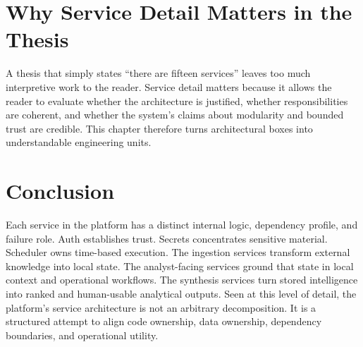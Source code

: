 \section{Why Service Detail Matters in the Thesis}
A thesis that simply states ``there are fifteen services'' leaves too much interpretive work to the reader. Service detail matters because it allows the reader to evaluate whether the architecture is justified, whether responsibilities are coherent, and whether the system's claims about modularity and bounded trust are credible. This chapter therefore turns architectural boxes into understandable engineering units.

\section*{Conclusion}
Each service in the platform has a distinct internal logic, dependency profile, and failure role. Auth establishes trust. Secrets concentrates sensitive material. Scheduler owns time-based execution. The ingestion services transform external knowledge into local state. The analyst-facing services ground that state in local context and operational workflows. The synthesis services turn stored intelligence into ranked and human-usable analytical outputs. Seen at this level of detail, the platform's service architecture is not an arbitrary decomposition. It is a structured attempt to align code ownership, data ownership, dependency boundaries, and operational utility.
